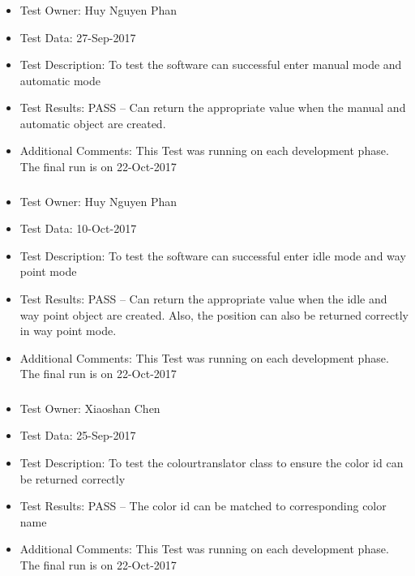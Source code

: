\documentclass[10pt,a4paper,titlepage]{article}
\begin{document}
	\subsubsection{}	
\begin{itemize}
\item Test Owner: Huy Nguyen Phan
\item Test Data: 27-Sep-2017
\item Test Description: To test the software can successful enter manual mode and automatic mode
\item Test Results: PASS – Can return the appropriate value when the manual and automatic object are created.
\item Additional Comments: This Test was running on each development phase. The final run is on 22-Oct-2017
\end{itemize}

	\subsubsection{}
\begin{itemize}
\item Test Owner: Huy Nguyen Phan
\item Test Data: 10-Oct-2017
\item Test Description: To test the software can successful enter idle mode and way point mode
\item Test Results: PASS – Can return the appropriate value when the idle and way point object are created. Also, the position can also be returned correctly in way point mode.
\item Additional Comments: This Test was running on each development phase. The final run is on 22-Oct-2017
\end{itemize}

	\subsubsection{}
\begin{itemize}
\item Test Owner: Xiaoshan Chen
\item Test Data: 25-Sep-2017
\item Test Description: To test the colourtranslator class to ensure the color id can be returned correctly
\item Test Results: PASS – The color id can be matched to corresponding color name
\item Additional Comments: This Test was running on each development phase. The final run is on 22-Oct-2017
\end{itemize}
\end{document}
